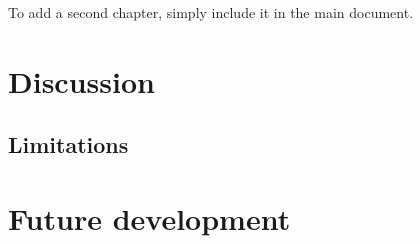 To add a second chapter, simply include it in the main document.

\section{Discussion}
\subsection{Limitations}
\section{Future development}
